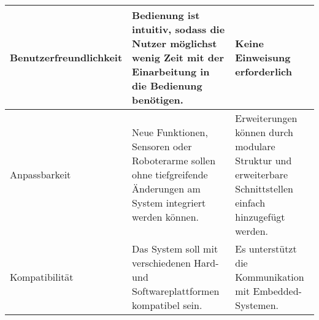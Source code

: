 \begin{longtable}{|>{\raggedright\arraybackslash}p{4cm}|>{\raggedright\arraybackslash}p{5cm}|>{\raggedright\arraybackslash}p{5cm}|}
        Benutzerfreundlichkeit & Bedienung ist intuitiv, sodass die Nutzer möglichst wenig Zeit mit der Einarbeitung in die Bedienung benötigen. 
        & Keine Einweisung erforderlich
        \\
        \hline
		Anpassbarkeit & Neue Funktionen, Sensoren oder Roboterarme sollen ohne tiefgreifende Änderungen am System integriert werden können. & Erweiterungen können durch modulare Struktur und erweiterbare Schnittstellen einfach hinzugefügt werden. \\ 
		\hline
		Kompatibilität & Das System soll mit verschiedenen Hard- und Softwareplattformen kompatibel sein. & Es unterstützt die Kommunikation mit Embedded-Systemen. \\ 
		\hline
		\hline
        \hline
        \hline
        \hline
	
\end{longtable}




